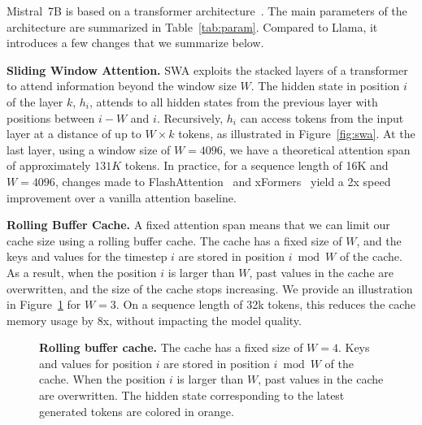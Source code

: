 \documentclass{article}
\def\llama{Llama\xspace}
\def\mistral{Mistral~7B\xspace}
\begin{document}
\mistral is based on a transformer architecture~\cite{vaswani2017attention}. The main parameters of the architecture are summarized in Table~\ref{tab:param}. Compared to \llama, it introduces a few changes that we summarize below.

 \textbf{Sliding Window Attention.} SWA exploits the stacked layers of a transformer to attend information beyond the window size $W$.
The hidden state in position $i$ of the layer $k$, $h_i$, attends to all hidden states from the previous layer with positions between $i-W$ and $i$.
Recursively, $h_i$ can access tokens from the input layer at a distance of up to $W \times k$ tokens, as illustrated in Figure~\ref{fig:swa}.
At the last layer, using a window size of $W=4096$, we have a theoretical attention span of approximately $131K$ tokens.
In practice, for a sequence length of 16K and $W=4096$, changes made to FlashAttention~\cite{dao2022flashattention} and xFormers~\cite{xFormers2022} yield a 2x speed improvement over a vanilla attention baseline.


 \textbf{Rolling Buffer Cache.} A fixed attention span means that we can limit our cache size using a rolling buffer cache.
The cache has a fixed size of $W$, and the keys and values for the timestep $i$ are stored in position $i \bmod W$ of the cache. As a result, when the position $i$ is larger than $W$, past values in the cache are overwritten, and the size of the cache stops increasing. We provide an illustration in Figure~\ref{fig:cache} for $W=3$.
On a sequence length of 32k tokens, this reduces the cache memory usage by 8x, without impacting the model quality.


\begin{figure}

\caption{\small \textbf{Rolling buffer cache.} The cache has a fixed size of $W=4$. Keys and values for position $i$ are stored in position $i \bmod W$ of the cache. When the position $i$ is larger than $W$, past values in the cache are overwritten.
The hidden state corresponding to the latest generated tokens are colored in orange.
}
\label{fig:cache}
\end{figure}
\end{document}
